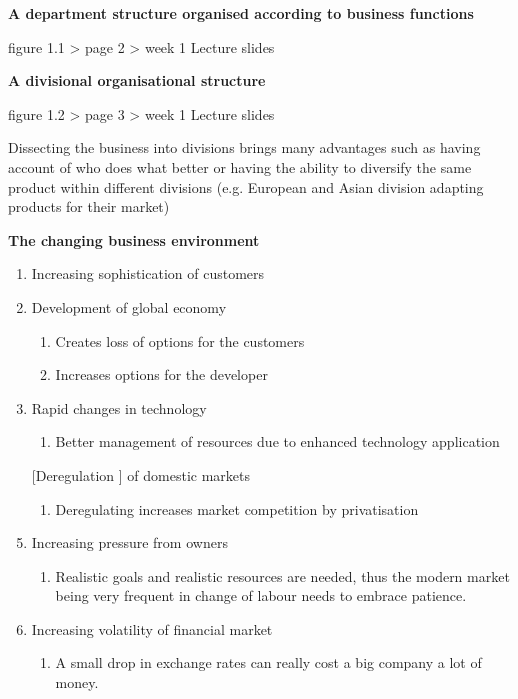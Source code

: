 \documentclass{article}
\begin{document}
\textbf{A department structure organised according to business functions}

\textsf{figure 1.1 > page 2 > week 1 Lecture slides}


\textbf{A divisional organisational structure}


\textsf{figure 1.2 > page 3 > week 1 Lecture slides}

Dissecting the business into divisions brings many advantages such as having account of who does what better or having the ability to diversify the same product within different divisions (e.g. European and Asian division adapting products for their market)

\clearpage

\textbf{The changing business environment}

\begin{enumerate}
  \item Increasing sophistication of customers
  \item Development of global economy
    \begin{enumerate}
      \item Creates loss of options for the customers 
      \item Increases options for the developer
    \end{enumerate}
  \item Rapid changes in technology
    \begin{enumerate}
  \item Better management of resources due to enhanced technology application
    \end{enumerate}
  \item [[Deregulation]] of domestic markets
    \begin{enumerate}
      \item Deregulating increases market competition by privatisation 
    \end{enumerate}
  \item Increasing pressure from owners
    \begin{enumerate}
  \item Realistic goals and realistic resources are needed, thus the modern market being very frequent in change of labour needs to embrace patience.
    \end{enumerate}
  \item Increasing volatility of financial market
    \begin{enumerate}
  \item A small drop in exchange rates can really cost a big company a lot of money. 
    \end{enumerate}
\end{enumerate}
    
\end{document}
